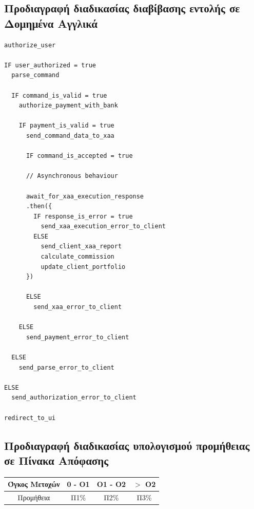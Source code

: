 \documentclass{article}
\begin{document}
\newpage
\subsection{Προδιαγραφή διαδικασίας διαβίβασης εντολής σε Δομημένα Αγγλικά}
\begin{lstlisting}
authorize_user

IF user_authorized = true
  parse_command

  IF command_is_valid = true
    authorize_payment_with_bank

    IF payment_is_valid = true
      send_command_data_to_xaa

	  IF command_is_accepted = true

	  // Asynchronous behaviour

	  await_for_xaa_execution_response
	  .then({
		IF response_is_error = true
		  send_xaa_execution_error_to_client
		ELSE
		  send_client_xaa_report
		  calculate_commission
		  update_client_portfolio
	  })

	  ELSE
	    send_xaa_error_to_client

    ELSE
      send_payment_error_to_client

  ELSE
    send_parse_error_to_client

ELSE
  send_authorization_error_to_client

redirect_to_ui

\end{lstlisting}

\newpage
\subsection{Προδιαγραφή διαδικασίας υπολογισμού προμήθειας σε Πίνακα Απόφασης}
\begin{center}
\addtolength\tabcolsep{5pt}
\begin{tabular}{ ||c|ccc|| } 
	 \hline
	 Όγκος Μετοχών & 0 - O1 & O1 - O2 & $>$ O2 \\
	 \hline
	 Προμήθεια & Π1\% & Π2\% & Π3\%\\  
	 \hline
\end{tabular}
\end{center}
\end{document}
